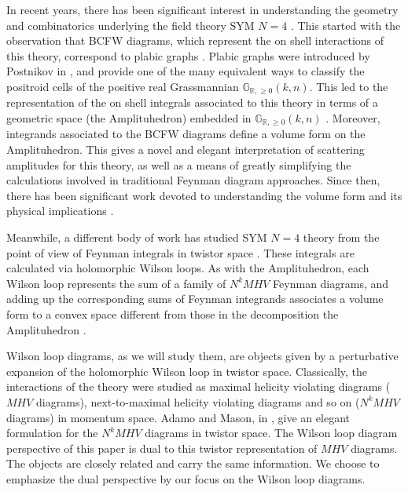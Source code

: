 \documentclass[11pt]{article}
\newcommand{\R}{\mathbb{R}}
\newcommand{\Gr}{\mathbb{G}_{\R, \geq 0}}
\theoremstyle{remark}
\theoremstyle{definition}
\begin{document}
In recent years, there has been significant interest in understanding the geometry and combinatorics underlying the field theory SYM $N=4$ \cite{wilsonloop, Arkani-Hamed:2013jha, Amplituhedronsquared, galashinlam, AmplituhedronDecomposition}. This started with the observation that BCFW diagrams, which represent the on shell interactions of this theory, correspond to plabic graphs \cite{GrassmannAmplitudebook}. Plabic graphs were introduced by Postnikov in \cite[section 11]{Postnikov}, and provide one of the many equivalent ways to classify the positroid cells of the positive real Grassmannian $\Gr(k,n)$. This led to the representation of the on shell integrals associated to this theory in terms of a geometric space (the Amplituhedron) embedded in $\Gr(k,n)$ \cite{Arkani-Hamed:2013kca,Arkani-Hamed:2013jha}. Moreover, integrands associated to the BCFW diagrams define a volume form on the Amplituhedron. This gives a novel and elegant interpretation of scattering amplitudes for this theory, as well as a means of greatly simplifying the calculations involved in traditional Feynman diagram approaches. Since then, there has been significant work devoted to understanding the volume form and its physical implications \cite{UnwindingAmplituhedron,galashinlam}.

Meanwhile, a different body of work has studied SYM $N=4$ theory from the point of view of Feynman integrals in twistor space \cite{Adamo:2011pv,Adamo:2012xe,  Boels:2007qn, Bullimore:2010pj}. These integrals are calculated via holomorphic Wilson loops. As with the Amplituhedron, each Wilson loop represents the sum of a family of $N^kMHV$ Feynman diagrams, and adding up the corresponding sums of Feynman integrands associates a volume form to a convex space different from those in the decomposition the Amplituhedron \cite{CachazoSvrcekWitten, Hodges2013}.

Wilson loop diagrams, as we will study them, are objects given by a perturbative expansion of the holomorphic Wilson loop in twistor space.
Classically, the interactions of the theory were studied as maximal helicity violating diagrams ($MHV$ diagrams), next-to-maximal helicity violating diagrams and so on ($N^kMHV$ diagrams) in momentum space. Adamo and Mason, in \cite{Adamo:2011pr}, give an elegant formulation for the $N^kMHV$ diagrams in twistor space. The Wilson loop diagram perspective of this paper is dual to this twistor representation of $MHV$ diagrams.
The objects are closely related and carry the same information.  We choose to emphasize the dual perspective by our focus on the Wilson loop diagrams.
\end{document}
